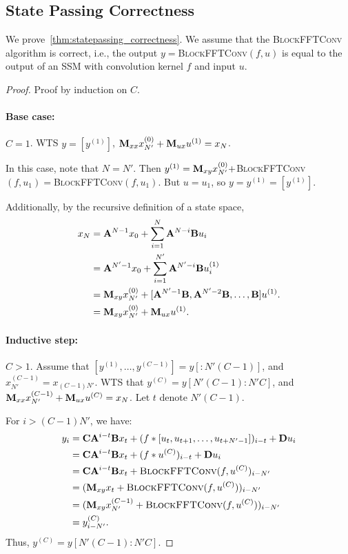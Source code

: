 \subsection{State Passing Correctness}
\label{sec:app_statepassing_correctness_proof}

We prove~\cref{thm:statepassing_correctness}.
We assume that the \textsc{BlockFFTConv} algorithm is correct, i.e., the output $y = $\textsc{BlockFFTConv}$(f, u)$ is equal to the output of an SSM with convolution kernel $f$ and input $u$.

\begin{proof}  
Proof by induction on $C$.

\paragraph{Base case:} $C = 1$.
WTS $y = [y^{(1)}]$, $\mathbf{M}_{xx}x_{N'}^{(0)} + \mathbf{M}_{ux}u^{(1)} = x_{N}$.

In this case, note that $N = N'$.
Then $y^{(1)} = \mathbf{M}_{xy}x_{N'}^{(0)} + $\textsc{BlockFFTConv}$(f, u_1) = $\textsc{BlockFFTConv}$(f, u_1)$.
But $u = u_1$, so $y = y^{(1)} = [y^{(1)}]$.

Additionally, by the recursive definition of a state space,
\begin{align*}
 x_{N} &= \mathbf{A}^{N-1}x_0 + \sum_{i=1}^N \mathbf{A}^{N-i}\mathbf{B} u_i \\
 &= \mathbf{A}^{N'-1}x_0 + \sum_{i=1}^{N'} \mathbf{A}^{N'-i}\mathbf{B} u^{(1)}_i \\
 &= \mathbf{M}_{xy}x_{N'}^{(0)} + [\mathbf{A}^{N'-1}\mathbf{B}, \mathbf{A}^{N'-2}\mathbf{B}, \dots, \mathbf{B}]u^{(1)}. \\
 &= \mathbf{M}_{xy}x_{N'}^{(0)} + \mathbf{M}_{ux}u^{(1)}.
\end{align*}

\paragraph{Inductive step:} $C > 1$.
Assume that $[y^{(1)}, \dots, y^{(C-1)}] = y[:N'(C-1)]$, and $x_{N'}^{(C-1)} = x_{(C-1)N'}$.
WTS that $y^{(C)} = y[N'(C-1):N'C]$, and $\mathbf{M}_{xx}x_{N'}^{(C-1)} + \mathbf{M}_{ux}u^{(C)} = x_{N}$.
Let $t$ denote $N'(C-1)$.

For $i > (C-1)N'$, we have:
\begin{align*}
y_i &= \mathbf{C}\mathbf{A}^{i-t}\mathbf{B} x_{t} + (f \ast [u_{t}, u_{t+1}, \dots, u_{t+N'-1}])_{i-t} + \mathbf{D} u_i \\
&= \mathbf{C}\mathbf{A}^{i-t}\mathbf{B} x_{t} + (f \ast u^{(C)})_{i-t} + \mathbf{D} u_i \\
&= \mathbf{C}\mathbf{A}^{i-t}\mathbf{B} x_{t} + \textsc{BlockFFTConv}(f, u^{(C)})_{i-N'} \\
&= (\mathbf{M}_{xy}x_t + \textsc{BlockFFTConv}(f, u^{(C)}))_{i-N'} \\
&= (\mathbf{M}_{xy}x_{N'}^{(C-1)} + \textsc{BlockFFTConv}(f, u^{(C)}))_{i-N'} \\
&= y^{(C)}_{i-N'}.
\end{align*}
Thus, $y^{(C)} = y[N'(C-1):N'C]$.


\end{proof}
